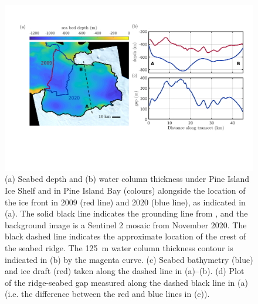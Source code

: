 \documentclass[draft]{agujournal2019}
\begin{document}
\begin{figure}
    \centering
    \includegraphics[width = \textwidth]{../make_figures/plots/figure1_cropped.pdf}
    \caption{(a) Seabed depth and (b) water column thickness under Pine Island Ice Shelf and in Pine Island Bay (colours) alongside the location of the ice front in 2009 (red line) and 2020 (blue line), as indicated in (a). The solid black line indicates the grounding line from , and the background image is a Sentinel 2 mosaic from November 2020. The black dashed line indicates the approximate location of the crest of the seabed ridge. The 125~m  water column thickness contour is indicated in (b) by the magenta curve.  (c) Seabed bathymetry (blue) and ice draft (red) taken along the dashed line in (a)--(b). (d) Plot of the ridge-seabed gap measured along the dashed black line in (a) (i.e. the difference between the red and blue lines in (c)). }
    \label{fig:figure1}
\end{figure}
\end{document}
